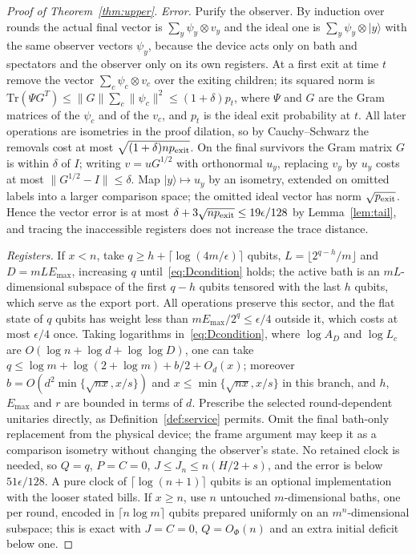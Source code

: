 \documentclass[11pt,a4paper]{article}
\theoremstyle{plain}
\theoremstyle{definition}
\theoremstyle{remark}
\begin{document}
\begin{proof}[Proof of Theorem~\ref{thm:upper}]
\emph{Error.} Purify the observer. By induction over rounds the actual final vector is $\sum_y\psi_y\otimes v_y$ and the
ideal one is $\sum_y\psi_y\otimes|y\rangle$ with the same observer vectors $\psi_y$, because the device acts only on bath and
spectators and the observer only on its own registers. At a first exit at time $t$ remove the vector
$\sum_c\psi_c\otimes v_c$ over the exiting children; its squared norm is $\mathrm{Tr}(\Psi G^T)\le\|G\|\sum_c\|\psi_c\|^2\le(1+\delta)p_t$,
where $\Psi$ and $G$ are the Gram matrices of the $\psi_c$ and of the $v_c$, and $p_t$ is the ideal exit probability at
$t$. All later operations are isometries in the proof dilation, so by Cauchy--Schwarz the removals cost at most
$\sqrt{(1+\delta)np_{\rm exit}}$. On the final survivors the Gram matrix $G$ is within $\delta$ of $I$; writing $v=uG^{1/2}$
with orthonormal $u_y$, replacing $v_y$ by $u_y$ costs at most $\|G^{1/2}-I\|\le\delta$. Map $|y\rangle\mapsto u_y$ by an
isometry, extended on omitted labels into a larger comparison space; the omitted ideal vector has norm
$\sqrt{p_{\rm exit}}$. Hence the vector error is at most $\delta+3\sqrt{np_{\rm exit}}\le19\epsilon/128$ by
Lemma~\ref{lem:tail}, and tracing the inaccessible registers does not increase the trace distance.

\emph{Registers.} If $x<n$, take $q\ge h+\lceil\log(4m/\epsilon)\rceil$ qubits, $L=\lfloor2^{q-h}/m\rfloor$ and $D=mLE_{\max}$,
increasing $q$ until~\eqref{eq:Dcondition} holds; the active bath is an $mL$-dimensional subspace of the first $q-h$
qubits tensored with the last $h$ qubits, which serve as the export port. All operations preserve this sector, and the
flat state of $q$ qubits has weight less than $mE_{\max}/2^q\le\epsilon/4$ outside it, which costs at most $\epsilon/4$ once.
Taking logarithms in~\eqref{eq:Dcondition}, where $\log A_D$ and $\log L_c$ are $O(\log n+\log d+\log\log D)$, one can take
$q\le\log m+\log(2+\log m)+b/2+O_d(x)$; moreover $b=O(d^2\min\{\sqrt{nx},x/s\})$ and $x\le\min\{\sqrt{nx},x/s\}$ in this branch,
and $h$, $E_{\max}$ and $r$ are bounded in terms of $d$. Prescribe the selected round-dependent unitaries directly, as
Definition~\ref{def:service} permits. Omit the final bath-only replacement from the physical device; the frame argument may keep it as a
comparison isometry without changing the observer's state. No retained clock is needed, so $Q=q$, $P=C=0$, $J\le J_n\le n(H/2+s)$,
and the error is below $51\epsilon/128$. A pure clock of $\lceil\log(n+1)\rceil$ qubits is an optional implementation with the looser stated bills. If $x\ge n$, use $n$
untouched $m$-dimensional baths, one per round, encoded in $\lceil n\log m\rceil$ qubits prepared uniformly on an
$m^n$-dimensional subspace; this is exact with $J=C=0$, $Q=O_\Phi(n)$ and an extra initial deficit below one.
\end{proof}
\end{document}
